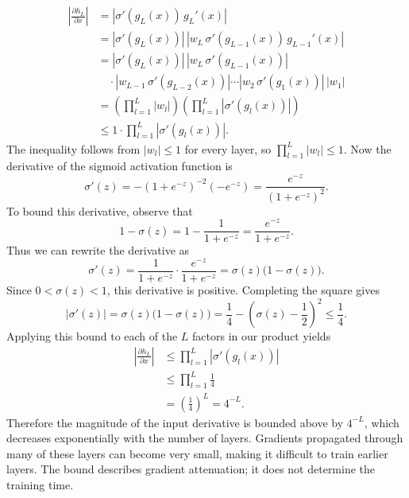 \documentclass[12pt]{article}
\begin{document}
\begin{enumerate}
\begin{enumerate}[label=\textbf{\Alph*.}, leftmargin=*]
\begin{enumerate}[(i)]
    \[
    \begin{aligned}
        \left|\frac{\partial h_L}{\partial x}\right|
            &= \left|\sigma'(g_L(x))\,g_L'(x)\right| \\
            &= \left|\sigma'(g_L(x))\right|\,
               \left|w_L\,\sigma'(g_{L-1}(x))\,g_{L-1}'(x)\right| \\
            &= \left|\sigma'(g_L(x))\right|\,
               \left|w_L\,\sigma'(g_{L-1}(x))\right| \\
            &\quad {}\cdot \left|w_{L-1}\,\sigma'(g_{L-2}(x))\right|
               \cdots
               \left|w_2\,\sigma'(g_1(x))\right|\,|w_1| \\
            &= \left(\prod_{l=1}^{L}|w_l|\right)
               \left(\prod_{l=1}^{L}\left|\sigma'(g_l(x))\right|\right) \\
            &\leq 1\cdot \prod_{l=1}^{L}\left|\sigma'(g_l(x))\right|.
    \end{aligned}
    \]
    The inequality follows from $|w_l| \leq 1$ for every layer, so $\prod_{l=1}^{L}|w_l| \leq 1$. Now the derivative of the sigmoid activation function is
    \[
        \sigma'(z) = -(1+e^{-z})^{-2}(-e^{-z})
        = \frac{e^{-z}}{(1+e^{-z})^2}.
    \]
    To bound this derivative, observe that
    \[
        1-\sigma(z) = 1-\frac{1}{1+e^{-z}}
        = \frac{e^{-z}}{1+e^{-z}}.
    \]
    Thus we can rewrite the derivative as
    \[
        \sigma'(z) = \frac{1}{1+e^{-z}}\cdot\frac{e^{-z}}{1+e^{-z}}
        = \sigma(z)\bigl(1-\sigma(z)\bigr).
    \]
    Since $0<\sigma(z)<1$, this derivative is positive. Completing the square gives
    \[
        |\sigma'(z)| = \sigma(z)\bigl(1-\sigma(z)\bigr)
        = \frac14-\left(\sigma(z)-\frac12\right)^2
        \leq \frac14.
    \]
    Applying this bound to each of the $L$ factors in our product yields
    \[
    \begin{aligned}
        \left|\frac{\partial h_L}{\partial x}\right|
            &\leq \prod_{l=1}^{L}\left|\sigma'(g_l(x))\right| \\
            &\leq \prod_{l=1}^{L}\frac14 \\
            &= \boxed{\left(\frac14\right)^L = 4^{-L}}.
    \end{aligned}
    \]
    Therefore the magnitude of the input derivative is bounded above by $4^{-L}$, which decreases exponentially with the number of layers. Gradients propagated through many of these layers can become very small, making it difficult to train earlier layers. The bound describes gradient attenuation; it does not determine the training time.


\end{enumerate}
\end{enumerate}
\end{enumerate}
\end{document}

